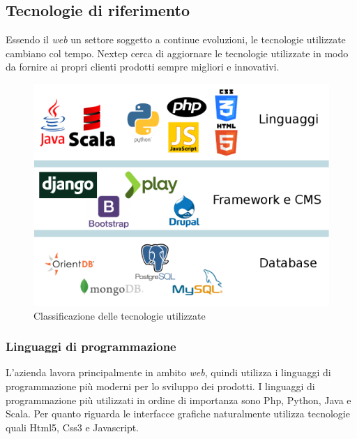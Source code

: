 \subsection{Tecnologie di riferimento}
Essendo il \emph{web} un settore soggetto a continue evoluzioni, le tecnologie utilizzate cambiano col tempo. Nextep cerca di aggiornare le tecnologie utilizzate in modo da fornire ai propri clienti prodotti sempre migliori e innovativi.
\begin{figure}[h]
\centering
\includegraphics[scale=0.35]{immagini/tecnologie}
\caption{Classificazione delle tecnologie utilizzate}
\label{fig:tecnologie-utilizzate}
\end{figure}

\subsubsection{Linguaggi di programmazione}
L'azienda lavora principalmente in ambito \emph{web}, quindi utilizza i linguaggi di programmazione più moderni per lo sviluppo dei prodotti. I linguaggi di programmazione più utilizzati in ordine di importanza sono Php, Python, Java e Scala. Per quanto riguarda le interfacce grafiche naturalmente utilizza tecnologie quali Html5, Css3 e Javascript.

